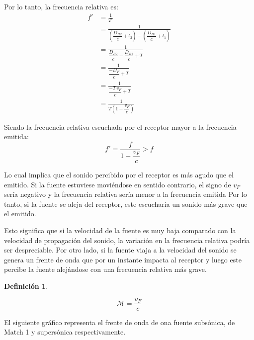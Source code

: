 \documentclass[a5paper,12pt,twoside]{book}
\newtheorem{defn}{{Definición}}[chapter]
\begin{document}
Por lo tanto, la frecuencia relativa es:
\begin{align*}
    f' &= \frac{1}{T'}
    \\
    &= \frac{1}{\left( \dfrac{D_{R2}}{c}+t_2 \right) - \left( \dfrac{D_{R1}}{c}+t_1 \right)}
    \\
    &= \frac{1}{\dfrac{D_{R2}}{c} - \dfrac{D_{R1}}{c} + T}
    \\
    &= \frac{1}{\dfrac{-D_F}{c} + T}
    \\
    &= \frac{1}{\dfrac{-T \, v_F}{c} + T}
    \\
    &= \frac{1}{T\left(1-\dfrac{v_F}{c}\right)}
\end{align*}

Siendo la frecuencia relativa escuchada por el receptor mayor a la frecuencia emitida:
\begin{equation*}
    f' = \frac{f}{1-\dfrac{v_F}{c}} > f
\end{equation*}

Lo cual implica que el sonido percibido por el receptor es más agudo que el emitido.
Si la fuente estuviese moviéndose en sentido contrario, el signo de $v_F$ sería negativo y la frecuencia relativa sería menor a la frecuencia emitida
Por lo tanto, si la fuente se aleja del receptor, este escucharía un sonido más grave que el emitido.

Esto significa que si la velocidad de la fuente es muy baja comparado con la velocidad de propagación del sonido, la variación en la frecuencia relativa podría ser despreciable.
Por otro lado, si la fuente viaja a la velocidad del sonido se genera un frente de onda que por un instante impacta al receptor y luego este percibe la fuente alejándose con una frecuencia relativa más grave.

\begin{mdframed}[style=MyFrame1]
    \begin{defn}
    \end{defn}
    \begin{equation*}
        \mathcal{M} = \frac{v_F}{c}
    \end{equation*}
\end{mdframed}

El siguiente gráfico representa el frente de onda de ona fuente subsónica, de Match 1 y supersónica respectivamente.
\end{document}
